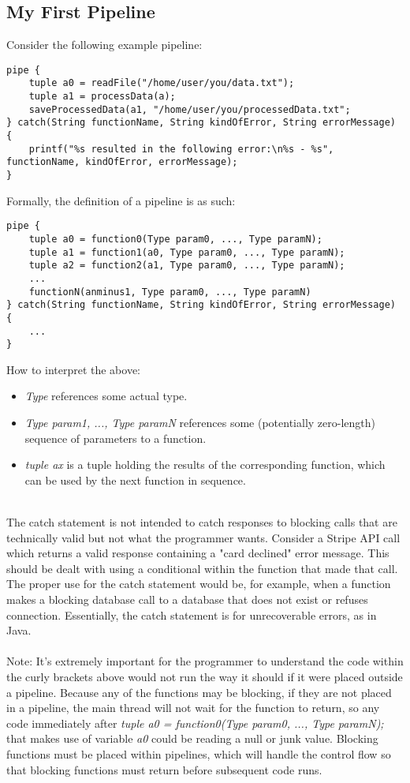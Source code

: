 \documentclass[./LRM_main.tex]{subfiles}
\begin{document}
\subsection{My First Pipeline}
Consider the following example pipeline:

\begin{lstlisting}
pipe {
	tuple a0 = readFile("/home/user/you/data.txt"); 
 	tuple a1 = processData(a); 
	saveProcessedData(a1, "/home/user/you/processedData.txt";
} catch(String functionName, String kindOfError, String errorMessage) {
    printf("%s resulted in the following error:\n%s - %s", functionName, kindOfError, errorMessage);
}
\end{lstlisting}
Formally, the definition of a pipeline is as such:
\begin{lstlisting}
pipe {
	tuple a0 = function0(Type param0, ..., Type paramN); 
	tuple a1 = function1(a0, Type param0, ..., Type paramN); 
	tuple a2 = function2(a1, Type param0, ..., Type paramN);
	... 
	functionN(anminus1, Type param0, ..., Type paramN)
} catch(String functionName, String kindOfError, String errorMessage) {
    ...
}
\end{lstlisting}
How to interpret the above:\\
\begin{itemize}
    \item \textit{Type} references some actual type.\\
    \item \textit{Type param1, ..., Type paramN} references some (potentially zero-length) sequence of parameters to a function.\\
    \item \textit{tuple ax} is a tuple holding the results of the corresponding function, which can be used by the next function in sequence.\\\\
\end{itemize}
The catch statement is not intended to catch responses to blocking calls that are technically valid but not what the programmer wants. Consider a Stripe API call which returns a valid response
containing a "card declined" error message. This should be dealt with using a conditional within the function that made that call. The proper use for the catch statement would be, for example,
when a function makes a blocking database call to a database that does not exist or refuses connection. Essentially, the catch statement is for unrecoverable errors, as in Java.\\\\
Note: It's extremely important for the programmer to understand the code within the curly brackets above would not run the way it should if it were placed outside a pipeline. Because any of the functions
may be blocking, if they are not placed in a pipeline, the main thread will not wait for the function to return, so any code immediately after \textit{tuple a0 = function0(Type param0, ..., Type
paramN);} that makes use of variable \textit{a0} could be reading a null or junk value. Blocking functions must be placed within pipelines, which will handle the control flow so that blocking functions must return before subsequent code runs.
\end{document}
